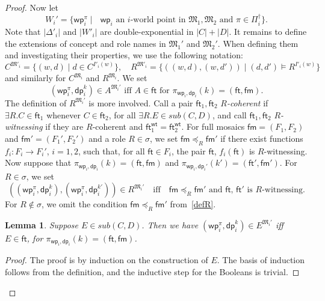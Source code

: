 \documentclass[10pt,a4paper]{amsart}
\theoremstyle{plain}
\newtheorem{lem}[thm]{Lemma}
\theoremstyle{definition}
\newcommand{\sub}{\textit{sub}}
\newcommand{\wt}{\mathsf{wt}}
\newcommand{\ft}{\mathsf{ft}}
\newcommand{\iwp}{\mathsf{wp}_i}
\newcommand{\idp}{\mathsf{dp}_i}
\newcommand{\pet}{\ft}
\newcommand{\pam}{\mathsf{fm}}
\begin{document}
\begin{proof}
Now let 
%
$$
W_{i}' = \{ \iwp^{\pi} \mid \text{ $\iwp$ an $i$-world point in $\mathfrak{M}_{1},\mathfrak{M}_{2}$ and $\pi\in \Pi_{i}^{\dag}$}\}.
$$
%
Note that $|\Delta'_i|$ and $|W'_i|$ are double-exponential in $|C|+|D|$. 
It remains to define the extensions of concept and role names in $\mathfrak{M}_{1}'$ and $\mathfrak{M}_{2}'$. 
When defining them and investigating their properties, we use the following notation: 
%
$$
C^{\mathfrak M'_i} = \{ (w,d) \mid d \in C^{I'_i(w)}\},\quad 
R^{\mathfrak M'_i} = \{ ((w,d),(w,d')) \mid (d,d')\models R^{I'_i(w)}\}
$$
and similarly for $C^{\mathfrak{M}_{i}}$ and $R^{\mathfrak{M}_{i}}$. We set 
%
$$
\text{$(\iwp^{\pi},\idp^{k}) \in A^{\mathfrak{M}_{i}'}$ \ iff \ $A\in \pet$ \ for $\pi_{\iwp,\idp}(k)=(\pet,\pam)$.}
$$
%
The definition of $R^{\mathfrak{M}_{i}'}$ is more involved. Call a pair $\pet_{1},\pet_{2}$  \emph{$R$-coherent} if $\exists R.C\in \pet_{1}$ whenever $C\in \pet_{2}$, for all $\exists R.E\in \sub(C,D)$, and call $\pet_{1},\pet_{2}$ \emph{$R$-witnessing} if they are $R$-coherent and $\pet_{1}^{\wt}=\pet_{2}^{\wt}$. 
%	
For full mosaics $\pam=(F_{1},F_{2})$ and $\pam'=(F_{1}',F_{2}')$ and a role $R \in \sigma$, we set $\pam \preceq_{R} \pam'$ if there exist functions $f_{i} \colon F_{i} \rightarrow F_{i}'$, $i=1,2$, such that, for all $\pet\in F_{i}$, the pair $\pet$, $f_{i}(\pet)$ is $R$-witnessing.
%
Now suppose that $\pi_{\iwp,\idp}(k)=(\pet, \pam)$ and $\pi_{\iwp,\idp'}(k')=(\pet',\pam')$. For $R\in \sigma$, we set 
%
\begin{equation}\label{defR}
((\iwp^{\pi},\idp^{k}),(\iwp^{\pi},\idp^{k'})) \in R^{\mathfrak{M}_{i}'} \quad \text{iff}\quad
\text{$\pam \preceq_{R} \pam'$ and $\pet$, $\pet'$ is $R$-witnessing.}
\end{equation}
%
For $R \notin \sigma$, we omit the condition $\pam \preceq_{R} \pam'$ from~\eqref{defR}.


\begin{lem}\label{final-lemma}
Suppose $E \in \sub(C,D)$. Then we have $(\iwp^{\pi},\idp^{k}) \in E^{\mathfrak{M}_{i}'}$ iff $E\in \pet$, for $\pi_{\iwp,\idp}(k) = (\pet,\pam)$.
\end{lem}
%
\begin{proof}
The proof is by induction on the construction of $E$. The basis of induction follows from the  definition, and the inductive step for the Booleans is trivial.


\end{proof}
\end{proof}
\end{document}
